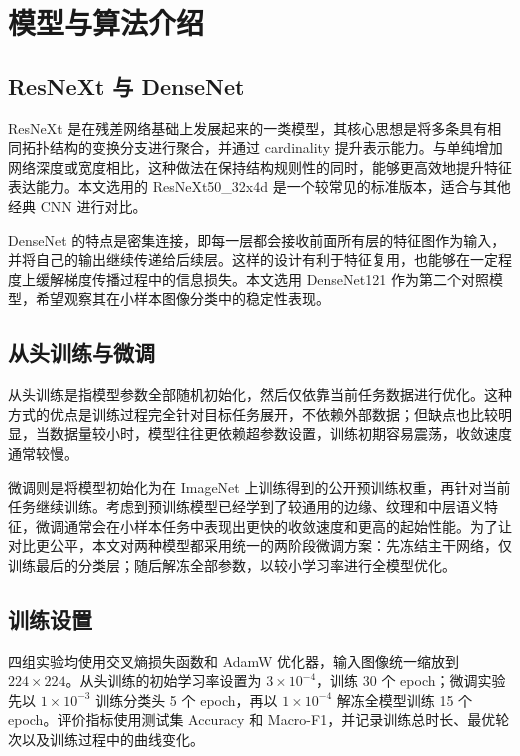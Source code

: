 \section{模型与算法介绍}

\subsection{ResNeXt 与 DenseNet}

ResNeXt 是在残差网络基础上发展起来的一类模型，其核心思想是将多条具有相同拓扑结构的变换分支进行聚合，并通过 cardinality 提升表示能力。与单纯增加网络深度或宽度相比，这种做法在保持结构规则性的同时，能够更高效地提升特征表达能力。本文选用的 ResNeXt50\_32x4d 是一个较常见的标准版本，适合与其他经典 CNN 进行对比。

DenseNet 的特点是密集连接，即每一层都会接收前面所有层的特征图作为输入，并将自己的输出继续传递给后续层。这样的设计有利于特征复用，也能够在一定程度上缓解梯度传播过程中的信息损失。本文选用 DenseNet121 作为第二个对照模型，希望观察其在小样本图像分类中的稳定性表现。

\subsection{从头训练与微调}

从头训练是指模型参数全部随机初始化，然后仅依靠当前任务数据进行优化。这种方式的优点是训练过程完全针对目标任务展开，不依赖外部数据；但缺点也比较明显，当数据量较小时，模型往往更依赖超参数设置，训练初期容易震荡，收敛速度通常较慢。

微调则是将模型初始化为在 ImageNet 上训练得到的公开预训练权重，再针对当前任务继续训练。考虑到预训练模型已经学到了较通用的边缘、纹理和中层语义特征，微调通常会在小样本任务中表现出更快的收敛速度和更高的起始性能。为了让对比更公平，本文对两种模型都采用统一的两阶段微调方案：先冻结主干网络，仅训练最后的分类层；随后解冻全部参数，以较小学习率进行全模型优化。

\subsection{训练设置}

四组实验均使用交叉熵损失函数和 AdamW 优化器，输入图像统一缩放到 $224 \times 224$。从头训练的初始学习率设置为 $3 \times 10^{-4}$，训练 30 个 epoch；微调实验先以 $1 \times 10^{-3}$ 训练分类头 5 个 epoch，再以 $1 \times 10^{-4}$ 解冻全模型训练 15 个 epoch。评价指标使用测试集 Accuracy 和 Macro-F1，并记录训练总时长、最优轮次以及训练过程中的曲线变化。
